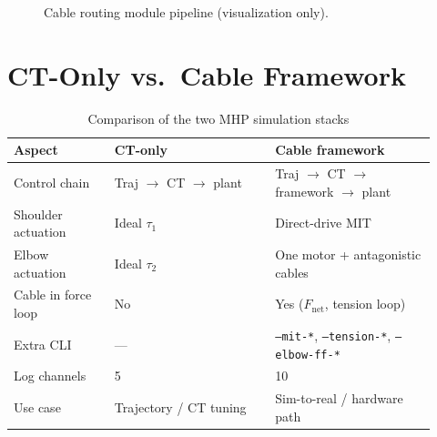 \documentclass[11pt,a4paper]{article}
\begin{document}
\begin{figure}[H]
\centering
{}
\caption{Cable routing module pipeline (visualization only).}
\end{figure}

\section{CT-Only vs.\ Cable Framework}

\begin{table}[H]
\centering
\caption{Comparison of the two MHP simulation stacks}
\begin{tabular}{@{}p{0.22\linewidth}p{0.35\linewidth}p{0.35\linewidth}@{}}
\toprule
\textbf{Aspect} & \textbf{CT-only} & \textbf{Cable framework} \\
\midrule
Control chain & Traj $\to$ CT $\to$ plant & Traj $\to$ CT $\to$ framework $\to$ plant \\
Shoulder actuation & Ideal $\tau_1$ & Direct-drive MIT \\
Elbow actuation & Ideal $\tau_2$ & One motor + antagonistic cables \\
Cable in force loop & No & Yes ($F_{\mathrm{net}}$, tension loop) \\
Extra CLI & --- & \texttt{--mit-*}, \texttt{--tension-*}, \texttt{--elbow-ff-*} \\
Log channels & 5 & 10 \\
Use case & Trajectory / CT tuning & Sim-to-real / hardware path \\
\bottomrule
\end{tabular}
\end{table}
\end{document}
